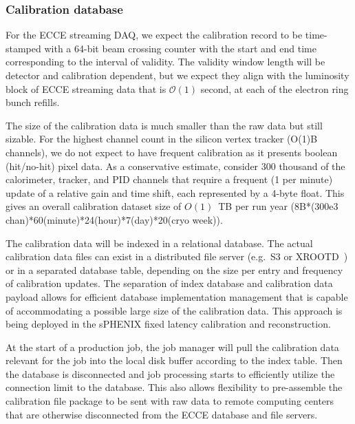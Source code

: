 \subsubsection{Calibration database}

For the ECCE streaming DAQ, we expect the calibration record to be time-stamped with a 64-bit beam crossing counter with the start and end time corresponding to the interval of validity. The validity window length will be detector and calibration dependent, but we expect they align with the luminosity block of ECCE streaming data that is $\mathcal{O}(1)$ second, at each of the electron ring bunch refills. 

The size of the calibration data is much smaller than the raw data but still sizable. For the highest channel count in the silicon vertex tracker (O(1)B channels), we do not expect to have frequent calibration as it presents boolean (hit/no-hit) pixel data. As a conservative estimate, consider 300 thousand of the calorimeter, tracker, and PID channels that require a frequent (1 per minute) update of a relative gain and time shift, each represented by a 4-byte float. This gives an overall calibration dataset size of $O(1)$~TB per run year (8B*(300e3 chan)*60(minute)*24(hour)*7(day)*20(cryo week)). 

The calibration data will be indexed in a relational database. The actual calibration data files can exist in a distributed file server (e.g.\ S3 or XROOTD~\cite{xROOTD}) or in a separated database table, depending on the size per entry and frequency of calibration updates. The separation of index database and calibration data payload allows for efficient database implementation management that is capable of accommodating a possible large size of the calibration data. This approach is being deployed in the sPHENIX fixed latency calibration and reconstruction.

At the start of a production job, the job manager will pull the calibration data relevant for the job into the local disk buffer according to the index table. Then the database is disconnected and job processing starts to efficiently utilize the connection limit to the database. This also allows flexibility to pre-assemble the calibration file package to be sent with raw data to remote computing centers that are otherwise disconnected from the ECCE database and file servers. 





